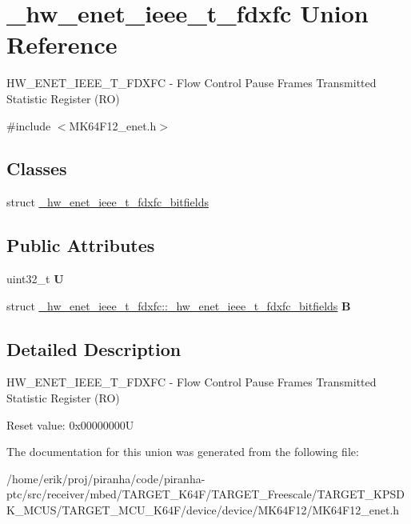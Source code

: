 \hypertarget{union__hw__enet__ieee__t__fdxfc}{}\section{\+\_\+hw\+\_\+enet\+\_\+ieee\+\_\+t\+\_\+fdxfc Union Reference}
\label{union__hw__enet__ieee__t__fdxfc}


H\+W\+\_\+\+E\+N\+E\+T\+\_\+\+I\+E\+E\+E\+\_\+\+T\+\_\+\+F\+D\+X\+FC -\/ Flow Control Pause Frames Transmitted Statistic Register (RO)  




{\ttfamily \#include $<$M\+K64\+F12\+\_\+enet.\+h$>$}

\subsection*{Classes}
\begin{DoxyCompactItemize}
\item 
struct \hyperlink{struct__hw__enet__ieee__t__fdxfc_1_1__hw__enet__ieee__t__fdxfc__bitfields}{\+\_\+hw\+\_\+enet\+\_\+ieee\+\_\+t\+\_\+fdxfc\+\_\+bitfields}
\end{DoxyCompactItemize}
\subsection*{Public Attributes}
\begin{DoxyCompactItemize}
\item 
uint32\+\_\+t {\bfseries U}\hypertarget{union__hw__enet__ieee__t__fdxfc_a33eaf7a1e7c3309ca8a2a6bd7cb12608}{}\label{union__hw__enet__ieee__t__fdxfc_a33eaf7a1e7c3309ca8a2a6bd7cb12608}

\item 
struct \hyperlink{struct__hw__enet__ieee__t__fdxfc_1_1__hw__enet__ieee__t__fdxfc__bitfields}{\+\_\+hw\+\_\+enet\+\_\+ieee\+\_\+t\+\_\+fdxfc\+::\+\_\+hw\+\_\+enet\+\_\+ieee\+\_\+t\+\_\+fdxfc\+\_\+bitfields} {\bfseries B}\hypertarget{union__hw__enet__ieee__t__fdxfc_ad417cc5437e5319a35c0d904ff015a65}{}\label{union__hw__enet__ieee__t__fdxfc_ad417cc5437e5319a35c0d904ff015a65}

\end{DoxyCompactItemize}


\subsection{Detailed Description}
H\+W\+\_\+\+E\+N\+E\+T\+\_\+\+I\+E\+E\+E\+\_\+\+T\+\_\+\+F\+D\+X\+FC -\/ Flow Control Pause Frames Transmitted Statistic Register (RO) 

Reset value\+: 0x00000000U 

The documentation for this union was generated from the following file\+:\begin{DoxyCompactItemize}
\item 
/home/erik/proj/piranha/code/piranha-\/ptc/src/receiver/mbed/\+T\+A\+R\+G\+E\+T\+\_\+\+K64\+F/\+T\+A\+R\+G\+E\+T\+\_\+\+Freescale/\+T\+A\+R\+G\+E\+T\+\_\+\+K\+P\+S\+D\+K\+\_\+\+M\+C\+U\+S/\+T\+A\+R\+G\+E\+T\+\_\+\+M\+C\+U\+\_\+\+K64\+F/device/device/\+M\+K64\+F12/M\+K64\+F12\+\_\+enet.\+h\end{DoxyCompactItemize}
